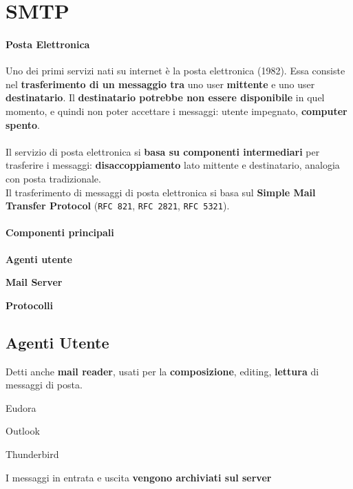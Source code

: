 \documentclass[10pt]{article}
\begin{document}
\section{SMTP}
\paragraph{Posta Elettronica} Uno dei primi servizi nati su internet è la posta elettronica (1982). Essa consiste nel \textbf{trasferimento di un messaggio tra} uno user \textbf{mittente} e uno user \textbf{destinatario}. Il \textbf{destinatario potrebbe non essere disponibile} in quel momento, e quindi non poter accettare i messaggi: utente impegnato, \textbf{computer spento}.\\\\
Il servizio di posta elettronica si \textbf{basa su componenti intermediari} per trasferire i messaggi: \textbf{disaccoppiamento} lato mittente e destinatario, analogia con posta tradizionale.\\
Il trasferimento di messaggi di posta elettronica si basa sul \textbf{Simple Mail Transfer Protocol} (\texttt{RFC 821}, \texttt{RFC 2821}, \texttt{RFC 5321}).
\paragraph{Componenti principali}
\begin{list}{}{}
\item \textbf{Agenti utente}
\item \textbf{Mail Server}
\item \textbf{Protocolli}
\end{list}
\subsection{Agenti Utente}
Detti anche \textbf{mail reader}, usati per la \textbf{composizione}, editing, \textbf{lettura} di messaggi di posta.
\begin{list}{}{Ad es:}
\item Eudora
\item Outlook
\item Thunderbird
\end{list}
I messaggi in entrata e uscita \textbf{vengono archiviati sul server}
\end{document}
